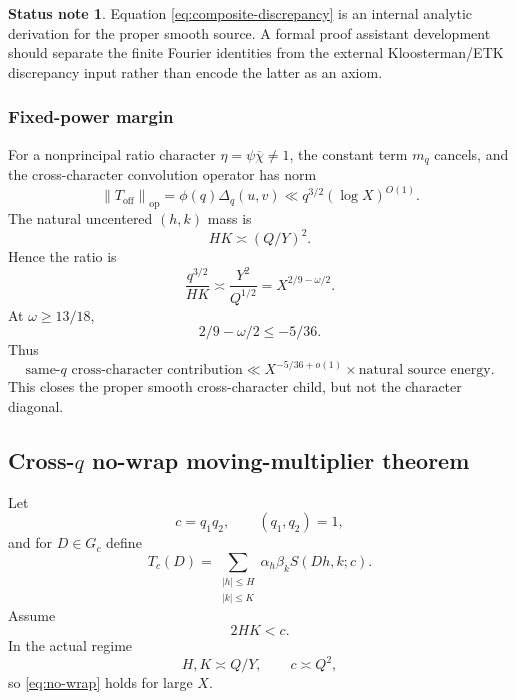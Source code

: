 \documentclass[11pt]{article}
\theoremstyle{definition}
\newtheorem{status}[status]{Status note}
\newcommand{\1}{\mathbf 1}
\newcommand{\norm}[1]{\left\lVert #1\right\rVert}
\begin{document}
\begin{status}
Equation \eqref{eq:composite-discrepancy} is an internal analytic
derivation for the proper smooth source.  A formal proof assistant
development should separate the finite Fourier identities from the external
Kloosterman/ETK discrepancy input rather than encode the latter as an axiom.
\end{status}

\subsubsection{Fixed-power margin}

For a nonprincipal ratio character $\eta=\psi\overline\chi\ne1$, the
constant term $m_q$ cancels, and the cross-character convolution operator
has norm
\[
   \norm{T_{\mathrm{off}}}_{\mathrm{op}}
   =
   \phi(q)\Delta_q(u,v)
   \ll
   q^{3/2}(\log X)^{O(1)}.
\]
The natural uncentered $(h,k)$ mass is
\[
   HK\asymp(Q/Y)^2.
\]
Hence the ratio is
\[
   \frac{q^{3/2}}{HK}
   \asymp
   \frac{Y^2}{Q^{1/2}}
   =
   X^{2/9-\omega/2}.
\]
At $\omega\ge13/18$,
\[
   2/9-\omega/2\le-5/36.
\]
Thus
\begin{equation}
 \boxed{
 \text{same-}q\text{ cross-character contribution}
 \ll
 X^{-5/36+o(1)}
 \times
 \text{natural source energy}.
 }
 \label{eq:sameq-margin}
\end{equation}
This closes the proper smooth cross-character child, but not the character
diagonal.

\subsection{Cross-\texorpdfstring{$q$}{q} no-wrap moving-multiplier theorem}

Let
\[
 c=q_1q_2,\qquad (q_1,q_2)=1,
\]
and for $D\in G_c$ define
\[
 T_c(D)
 =
 \sum_{\substack{|h|\le H\\|k|\le K}}
 \alpha_h\beta_kS(Dh,k;c).
\]
Assume
\begin{equation}
   2HK<c.
   \label{eq:no-wrap}
\end{equation}
In the actual regime
\[
   H,K\asymp Q/Y,\qquad c\asymp Q^2,
\]
so \eqref{eq:no-wrap} holds for large $X$.
\end{document}
